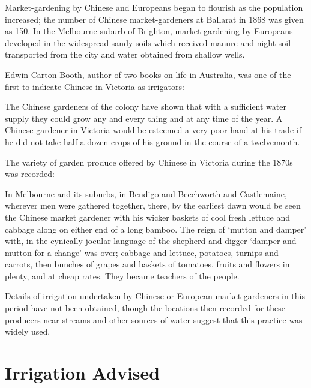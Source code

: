 Market-gardening  by Chinese and Europeans began
to flourish as the population increased; the number of Chinese
market-gardeners at Ballarat  in 1868 was given
as 150.  In the Melbourne suburb of Brighton, 
market-gardening by Europeans developed in the widespread sandy soils
which received manure and night-soil transported from the city and
water obtained from shallow wells.

Edwin Carton Booth,  author of two books on life
in Australia, was one of the first to indicate Chinese in Victoria as
irrigators:
\begin{Quote}
	The Chinese gardeners of the colony have shown that with a
	sufficient water supply they could grow any and every thing
	and at any time of the year. A Chinese gardener in Victoria
	would be esteemed a very poor hand at his trade if he did not
	take half a dozen crops of his ground in the course of a
	twelvemonth.
\end{Quote}

The variety of garden produce offered by Chinese in Victoria during
the 1870s was record\-ed:
\begin{Quote}
	In Melbourne and its suburbs, in Bendigo and Beechworth and
	Castlemaine, wherever men were gathered together, there, by
	the earliest dawn would be seen the Chinese market gardener
	with his wicker baskets of cool fresh lettuce and cabbage
	along on either end of a long bamboo.  The reign of `mutton
	and damper' with, in the cynically jocular language of the
	shepherd and digger `damper and mutton for a change' was over;
	cabbage and lettuce, potatoes, turnips and carrots, then
	bunches of grapes and baskets of tomatoes, fruits and flowers
	in plenty, and at cheap rates. They became teachers of the
	people.
\end{Quote}

Details of irrigation undertaken by Chinese or European market
gardeners in this period have not been obtained, though the locations
then recorded for these producers near streams and other sources of
water suggest that this practice was widely used.

\section*{Irrigation Advised}

